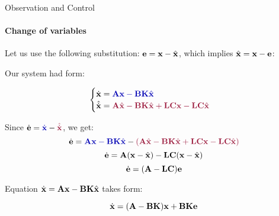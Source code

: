 \documentclass{beamer}
\begin{document}
\begin{frame}{Observation and Control}
\framesubtitle{Change of variables}
\begin{flushleft}

Let us use the following substitution: $\mathbf{e} = \mathbf{x} - \hat{\mathbf{x}}$, which implies $\hat{\mathbf{x}} = \mathbf{x} - \mathbf{e}$:

Our system had form:

\begin{equation}
\begin{cases}
\dot {\bo{x}} = \textcolor{mydarkblue}{\bo{A} \bo{x} - \bo{B}\bo{K} \hat{\bo{x}}} \\
\hat{\dot {\bo{x}}} = \textcolor{mydarkpink}{\bo{A} \hat{\bo{x}} - \bo{B}\bo{K} \hat{\bo{x}} + \bo{L}\bo{C} \bo{x} - \bo{L}\bo{C} \hat{\bo{x}}}
\end{cases}
\end{equation}

Since $\dot{\bo{e}} = \textcolor{mydarkblue}{\dot{\bo{x}}} - \textcolor{mydarkpink}{\hat{\dot{\bo{x}}}}$, we get:
%
\[
\dot{\bo{e}} = 
\textcolor{mydarkblue}{\bo{A} \bo{x} - \bo{B}\bo{K} \hat{\bo{x}}} - 
\textcolor{mydarkpink}{(\bo{A} \hat{\bo{x}} - \bo{B}\bo{K} \hat{\bo{x}} + \bo{L}\bo{C} \bo{x} - \bo{L}\bo{C} \hat{\bo{x}})}
\]
%
\[
\dot{\mathbf{e}} = 
\mathbf{A} (\mathbf{x} - \hat{\mathbf{x}})  - \mathbf{L}\mathbf{C}(\mathbf{x} - \hat{\mathbf{x}})
\]
%
\[
\dot{\mathbf{e}} = 
(\mathbf{A}  - \mathbf{L}\mathbf{C})\mathbf{e}
\]

Equation $\dot {\mathbf{x}} = \mathbf{A} \mathbf{x} - \mathbf{B}\mathbf{K} \hat{\mathbf{x}}$ takes form:

\[
\dot {\mathbf{x}} = (\mathbf{A}-\mathbf{B}\mathbf{K}) \mathbf{x} +  \mathbf{B}\mathbf{K}\mathbf{e}
\]


\end{flushleft}
\end{frame}
\end{document}
